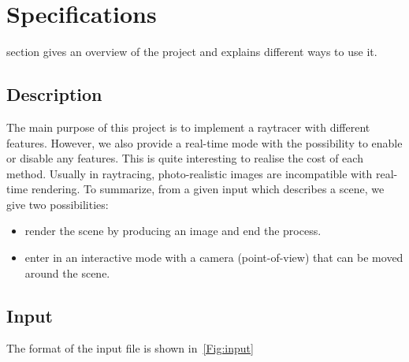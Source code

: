 \documentclass[a4paper,12pt,journal,twoside,compsoc]{PPIEEEtran}
\begin{document}
\section{Specifications}
\label{spec}
 section gives an overview of the project and explains different ways to use it.
\subsection{Description}
The main purpose of this project is to implement a raytracer with different
features. However, we also provide a real-time mode with the possibility to
enable or disable any features. This is quite interesting to realise the cost
of each method. Usually in raytracing, photo-realistic images are incompatible
with real-time rendering.
To summarize, from a given input which describes a scene, we give two possibilities:
\begin{itemize}
\item render the scene by producing an image and end the process.
\item enter in an interactive mode with a camera (point-of-view) that can be moved around the scene.
\end{itemize}

\subsection{Input}
The format of the input file is shown in~\ref{Fig:input}
\end{document}
